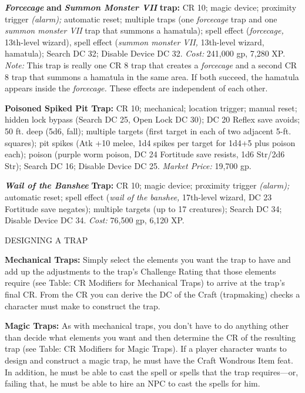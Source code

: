 \documentclass{article}
\begin{document}
\textit{\textbf{Forcecage }}\textbf{and }\textit{\textbf{Summon Monster VII }}\textbf{trap:} 
CR 10; magic device; proximity trigger \textit{(alarm); }automatic reset; multiple 
traps (one \textit{forcecage }trap and one \textit{summon monster VII }trap that 
summons a hamatula); spell effect (\textit{forcecage, }13th-level wizard), spell 
effect (\textit{summon monster VII, }13th-level wizard, hamatula); Search DC 32; 
Disable Device DC 32. \textit{Cost: }241,000 gp, 7,280 XP. \textit{Note: }This 
trap is really one CR 8 trap that creates a \textit{forcecage }and a second CR 
8 trap that summons a hamatula in the same area. If both succeed, the hamatula 
appears inside the \textit{forcecage. }These effects are independent of each other.

\textbf{Poisoned Spiked Pit Trap: }CR 10; mechanical; location trigger; manual 
reset; hidden lock bypass (Search DC 25, Open Lock DC 30); DC 20 Reflex save avoids; 
50 ft. deep (5d6, fall); multiple targets (first target in each of two adjacent 
5-ft. squares); pit spikes (Atk +10 melee, 1d4 spikes per target for 1d4+5 plus 
poison each); poison (purple worm poison, DC 24 Fortitude save resists, 1d6 Str/2d6 
Str); Search DC 16; Disable Device DC 25. \textit{Market Price: }19,700 gp. 

\textit{\textbf{Wail of the Banshee }}\textbf{Trap:} CR 10; magic device; proximity 
trigger \textit{(alarm); }automatic reset; spell effect (\textit{wail of the banshee, 
}17th-level wizard, DC 23 Fortitude save negates); multiple targets (up to 17 creatures); 
Search DC 34; Disable Device DC 34. \textit{Cost: }76,500 gp, 6,120 XP.

\vspace{12pt}
DESIGNING A TRAP

\textbf{Mechanical Traps: }Simply select the elements you want the trap to have 
and add up the adjustments to the trap's Challenge Rating that those elements require 
(see Table: CR Modifiers for Mechanical Traps) to arrive at the trap's final CR. 
From the CR you can derive the DC of the Craft (trapmaking) checks a character 
must make to construct the trap.

\textbf{Magic Traps:} As with mechanical traps, you don't have to do anything other 
than decide what elements you want and then determine the CR of the resulting trap 
(see Table: CR Modifiers for Magic Traps). If a player character wants to design 
and construct a magic trap, he must have the Craft Wondrous Item feat. In addition, 
he must be able to cast the spell or spells that the trap requires---or, failing 
that, he must be able to hire an NPC to cast the spells for him.
\end{document}
